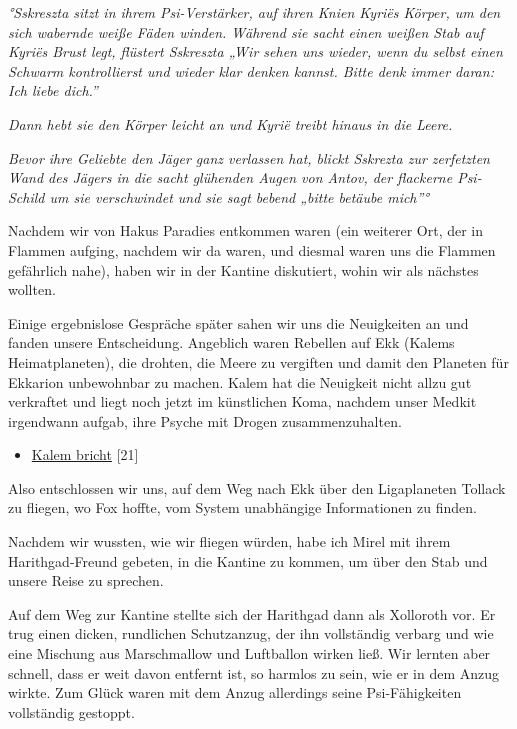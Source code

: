 \documentclass[11pt]{article}
\begin{document}
\emph{°Sskreszta sitzt in ihrem Psi-Verstärker, auf ihren Knien Kyriës
Körper, um den sich wabernde weiße Fäden winden. Während sie sacht einen
weißen Stab auf Kyriës Brust legt, flüstert Sskreszta „Wir sehen uns
wieder, wenn du selbst einen Schwarm kontrollierst und wieder klar
denken kannst. Bitte denk immer daran: Ich liebe dich.''}

\emph{Dann hebt sie den Körper leicht an und Kyrië treibt hinaus in die
Leere.}

\emph{Bevor ihre Geliebte den Jäger ganz verlassen hat, blickt Sskrezta
zur zerfetzten Wand des Jägers in die sacht glühenden Augen von Antov,
der flackerne Psi-Schild um sie verschwindet und sie sagt bebend „bitte
betäube mich''°}

Nachdem wir von Hakus Paradies entkommen waren (ein weiterer Ort, der in
Flammen aufging, nachdem wir da waren, und diesmal waren uns die Flammen
gefährlich nahe), haben wir in der Kantine diskutiert, wohin wir als
nächstes wollten.

Einige ergebnislose Gespräche später sahen wir uns die Neuigkeiten an
und fanden unsere Entscheidung. Angeblich waren Rebellen auf Ekk (Kalems
Heimatplaneten), die drohten, die Meere zu vergiften und damit den
Planeten für Ekkarion unbewohnbar zu machen. Kalem hat die Neuigkeit
nicht allzu gut verkraftet und liegt noch jetzt im künstlichen Koma,
nachdem unser Medkit irgendwann aufgab, ihre Psyche mit Drogen
zusammenzuhalten.

\begin{itemize}
\item
  \href{http://1w6.org/deutsch/kampagnen/waechter-der-zeit/aufzeichnungen/sskreszta-log/ekk-in-gefahr}{Kalem
  bricht} {[}21{]}
\end{itemize}
Also entschlossen wir uns, auf dem Weg nach Ekk über den Ligaplaneten
Tollack zu fliegen, wo Fox hoffte, vom System unabhängige Informationen
zu finden.

Nachdem wir wussten, wie wir fliegen würden, habe ich Mirel mit ihrem
Harithgad-Freund gebeten, in die Kantine zu kommen, um über den Stab und
unsere Reise zu sprechen.

Auf dem Weg zur Kantine stellte sich der Harithgad dann als Xolloroth
vor. Er trug einen dicken, rundlichen Schutzanzug, der ihn vollständig
verbarg und wie eine Mischung aus Marschmallow und Luftballon wirken
ließ. Wir lernten aber schnell, dass er weit davon entfernt ist, so
harmlos zu sein, wie er in dem Anzug wirkte. Zum Glück waren mit dem
Anzug allerdings seine Psi-Fähigkeiten vollständig gestoppt.
\end{document}
